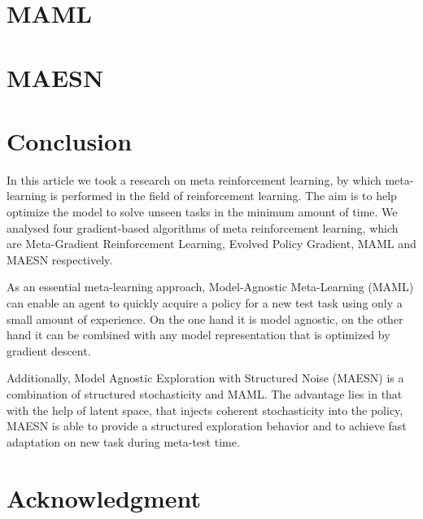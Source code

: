 \documentclass[conference]{IEEEtran}
\begin{document}
	\section{MAML}
		
	\section{MAESN}
		
	
	
	\section{Conclusion}
	In this article we took a research on meta reinforcement learning, by which meta-learning is performed in the field of reinforcement learning. The aim is to help optimize the model to solve unseen tasks in the minimum amount of time. We analysed four gradient-based algorithms of meta reinforcement learning, which are Meta-Gradient Reinforcement Learning, Evolved Policy Gradient, MAML and MAESN respectively.
	
	
	As an essential meta-learning approach, Model-Agnostic Meta-Learning (MAML) can enable an agent to quickly acquire a policy for a new test task using only a small amount of experience. On the one hand it is model agnostic, on the other hand it can be combined with any model representation
    that is optimized by gradient descent.
    
    Additionally, Model Agnostic Exploration with Structured Noise (MAESN) is a combination of structured stochasticity and MAML. The advantage lies in that with the help of latent space, that injects coherent stochasticity into the policy, MAESN is able to provide a structured exploration behavior and to achieve fast adaptation on new task during meta-test time.
	
	
	
	
	
	
	\section*{Acknowledgment}
	
\end{document}
